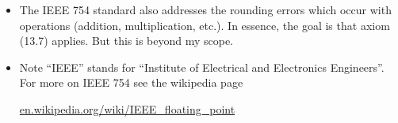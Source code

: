 \documentclass[11pt]{amsart}
\begin{document}
\begin{itemize}
\item The IEEE 754 standard also addresses the rounding errors which occur with operations (addition, multiplication, etc.).  In essence, the goal is that axiom (13.7) applies.  But this is beyond my scope.

\item Note ``IEEE'' stands for ``Institute of Electrical and Electronics Engineers''.  For more on IEEE 754 see the wikipedia page

 \centerline{\url{en.wikipedia.org/wiki/IEEE_floating_point}}

\end{itemize}
\end{document}
